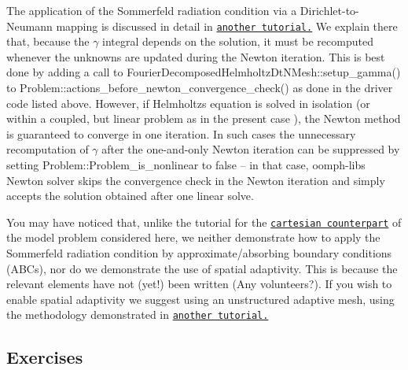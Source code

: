 \begin{DoxyItemize}
\item The application of the Sommerfeld radiation condition via a Dirichlet-\/to-\/\+Neumann mapping is discussed in detail in \href{../../../fourier_decomposed_helmholtz/sphere_scattering/html/index.html#DtN}{\tt another tutorial.} We explain there that, because the $ \gamma $ integral depends on the solution, it must be recomputed whenever the unknowns are updated during the Newton iteration. This is best done by adding a call to {\ttfamily Fourier\+Decomposed\+Helmholtz\+Dt\+N\+Mesh\+::setup\+\_\+gamma()} to {\ttfamily Problem\+::actions\+\_\+before\+\_\+newton\+\_\+convergence\+\_\+check()} as done in the driver code listed above. However, if Helmholtz\textquotesingle{}s equation is solved in isolation (or within a coupled, but linear problem as in the present case ), the Newton method is guaranteed to converge in one iteration. In such cases the unnecessary recomputation of $ \gamma $ after the one-\/and-\/only Newton iteration can be suppressed by setting {\ttfamily Problem\+::\+Problem\+\_\+is\+\_\+nonlinear} to {\ttfamily false} -- in that case, {\ttfamily oomph-\/lib\textquotesingle{}s} Newton solver skips the convergence check in the Newton iteration and simply accepts the solution obtained after one linear solve.
\item You may have noticed that, unlike the tutorial for the \href{../../../acoustic_fsi/acoustic_fsi_annulus/html/index.html}{\tt cartesian counterpart} of the model problem considered here, we neither demonstrate how to apply the Sommerfeld radiation condition by approximate/absorbing boundary conditions (A\+B\+Cs), nor do we demonstrate the use of spatial adaptivity. This is because the relevant elements have not (yet!) been written (Any volunteers?). If you wish to enable spatial adaptivity we suggest using an unstructured adaptive mesh, using the methodology demonstrated in \href{../../../fourier_decomposed_acoustic_fsi/unstructured_sphere/html/index.html#DtN}{\tt another tutorial.}
\end{DoxyItemize}



\hypertarget{index_ex}{}\subsection{Exercises}\label{index_ex}

